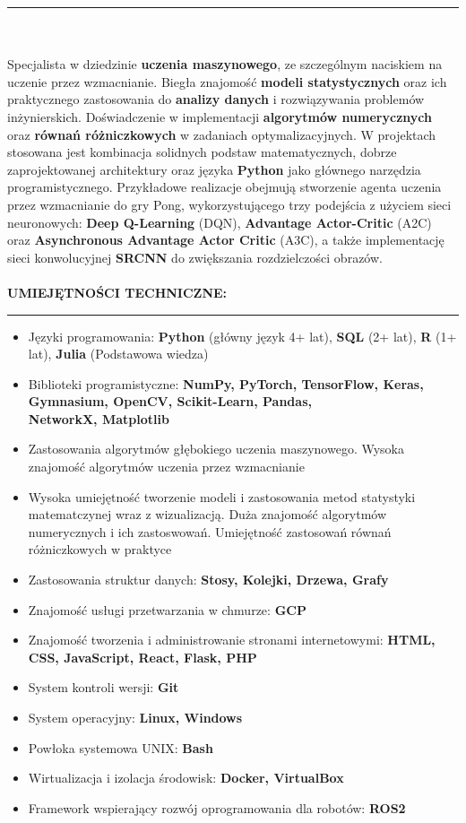 \documentclass[10pt]{article}
\newcommand{\longline}{\rule{19.6cm}{1pt}}
\begin{document}
\noindent \longline 
\\ \\
\noindent Specjalista w dziedzinie \textbf{uczenia maszynowego}, ze szczególnym naciskiem na uczenie przez wzmacnianie.
Biegła znajomość \textbf{modeli statystycznych} oraz ich praktycznego zastosowania do \textbf{analizy danych} i rozwiązywania problemów inżynierskich.
Doświadczenie w implementacji \textbf{algorytmów numerycznych} oraz \textbf{równań różniczkowych} w zadaniach optymalizacyjnych.
W projektach stosowana jest kombinacja solidnych podstaw matematycznych, dobrze zaprojektowanej architektury oraz języka \textbf{Python} jako głównego narzędzia programistycznego. 
Przykładowe realizacje obejmują stworzenie agenta uczenia przez wzmacnianie do gry Pong, wykorzystującego trzy podejścia z użyciem
sieci neuronowych: \textbf{Deep Q-Learning} (DQN), \textbf{Advantage Actor-Critic} (A2C) oraz \textbf{Asynchronous Advantage Actor Critic} (A3C), 
a także implementację sieci konwolucyjnej \textbf{SRCNN} do zwiększania rozdzielczości obrazów.
\\ \\
\noindent \fontsize{14pt}{14pt}\selectfont \textbf{\color{Violet}UMIEJĘTNOŚCI TECHNICZNE:}
\fontsize{10pt}{10pt}\selectfont 
\\ 
\noindent \longline 
\begin{itemize}[leftmargin=*, parsep=0.5pt]
    \item Języki programowania: \textbf{Python} (główny język 4+ lat), \textbf{SQL} (2+ lat), \textbf{R} (1+ lat), \textbf{Julia} (Podstawowa wiedza)
    \item Biblioteki programistyczne: \textbf{NumPy, PyTorch, TensorFlow, Keras, Gymnasium, OpenCV, Scikit-Learn, Pandas, \\ NetworkX, Matplotlib}
    \item Zastosowania algorytmów głębokiego uczenia maszynowego. Wysoka znajomość algorytmów uczenia przez wzmacnianie
    \item Wysoka umiejętność tworzenie modeli i zastosowania metod statystyki matematczynej wraz z wizualizacją. 
    Duża znajomość algorytmów numerycznych i ich zastoswowań. Umiejętność zastosowań równań różniczkowych w praktyce
    \item Zastosowania struktur danych: \textbf{Stosy, Kolejki, Drzewa, Grafy}
    \item Znajomość usługi przetwarzania w chmurze: \textbf{GCP}
    \item Znajomość tworzenia i administrowanie stronami internetowymi: \textbf{HTML, CSS, JavaScript, React, Flask, PHP}
    \item System kontroli wersji: \textbf{Git}
    \item System operacyjny: \textbf{Linux, Windows}
    \item Powłoka systemowa UNIX: \textbf{Bash} 
    \item Wirtualizacja i izolacja środowisk: \textbf{Docker, VirtualBox}
    \item Framework wspierający rozwój oprogramowania dla robotów: \textbf{ROS2}
\end{itemize}
\end{document}
